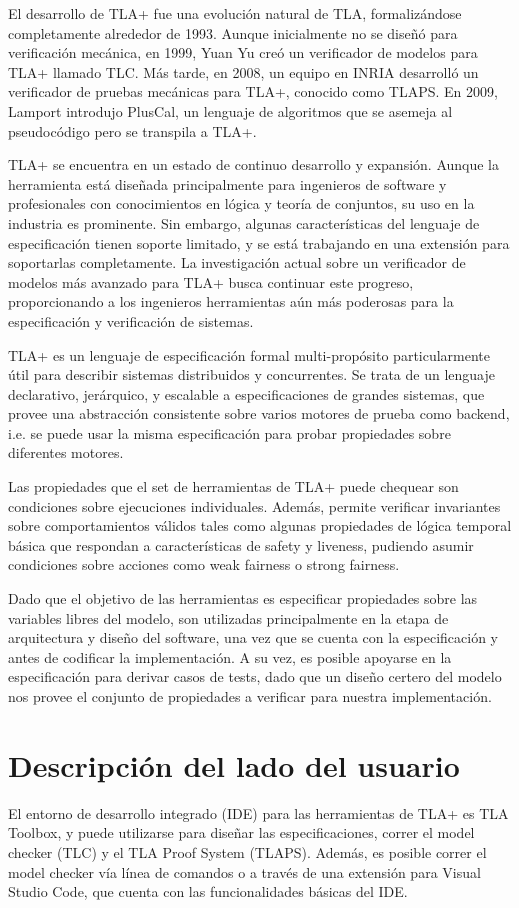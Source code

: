 \documentclass[runningheads]{llncs}
\begin{document}
El desarrollo de TLA+ fue una evolución natural de TLA, formalizándose completamente alrededor de 1993. Aunque inicialmente no se diseñó para verificación mecánica, en 1999, Yuan Yu creó un verificador de modelos para TLA+ llamado TLC. Más tarde, en 2008, un equipo en INRIA desarrolló un verificador de pruebas mecánicas para TLA+, conocido como TLAPS. En 2009, Lamport introdujo PlusCal, un lenguaje de algoritmos que se asemeja al pseudocódigo pero se transpila a TLA+.

TLA+ se encuentra en un estado de continuo desarrollo y expansión. Aunque la herramienta está diseñada principalmente para ingenieros de software y profesionales con conocimientos en lógica y teoría de conjuntos, su uso en la industria es prominente. Sin embargo, algunas características del lenguaje de especificación tienen soporte limitado, y se está trabajando en una extensión para soportarlas completamente. La investigación actual sobre un verificador de modelos más avanzado para TLA+ busca continuar este progreso, proporcionando a los ingenieros herramientas aún más poderosas para la especificación y verificación de sistemas.

TLA+ es un lenguaje de especificación formal multi-propósito particularmente útil para describir sistemas distribuidos y concurrentes. Se trata de un lenguaje declarativo, jerárquico, y escalable a especificaciones de grandes sistemas, que provee una abstracción consistente sobre varios motores de prueba como backend, i.e. se puede usar la misma especificación para probar propiedades sobre diferentes motores.

Las propiedades que el set de herramientas de TLA+ puede chequear son condiciones sobre ejecuciones individuales. Además, permite verificar invariantes sobre comportamientos válidos tales como algunas propiedades de lógica temporal básica que respondan a características de safety y liveness, pudiendo asumir condiciones sobre acciones como weak fairness o strong fairness.

Dado que el objetivo de las herramientas es especificar propiedades sobre las variables libres del modelo, son utilizadas principalmente en la etapa de arquitectura y diseño del software, una vez que se cuenta con la especificación y antes de codificar la implementación. A su vez, es posible apoyarse en la especificación para derivar casos de tests, dado que un diseño certero del modelo nos provee el conjunto de propiedades a verificar para nuestra implementación.

\section{Descripción del lado del usuario}
El entorno de desarrollo integrado (IDE) para las herramientas de TLA+ es TLA Toolbox, y puede utilizarse para diseñar las especificaciones, correr el model checker (TLC) y el TLA Proof System (TLAPS). Además, es posible correr el model checker vía línea de comandos o a través de una extensión para Visual Studio Code, que cuenta con las funcionalidades básicas del IDE.
\end{document}
